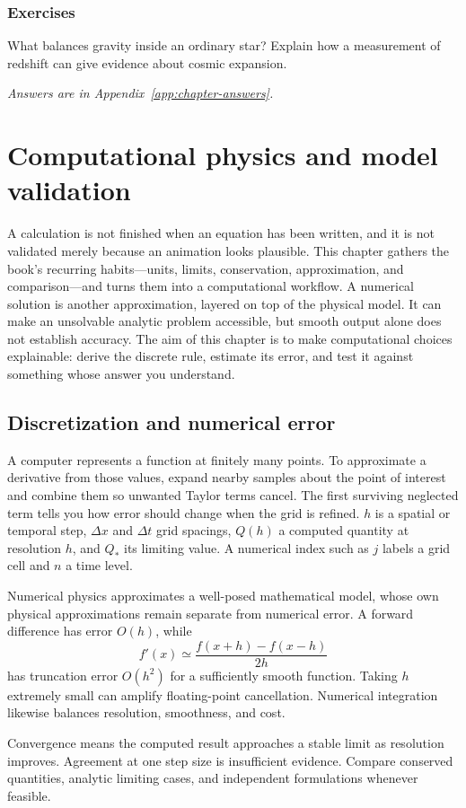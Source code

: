 \documentclass[11pt,oneside]{book}
\theoremstyle{reviewstyle}
\newcommand{\learningcheck}[1]{\subsection*{Exercises}\noindent #1\par\smallskip\noindent\emph{Answers are in Appendix~\ref{app:chapter-answers}.}}
\begin{document}
\learningcheck{What balances gravity inside an ordinary star? Explain how a measurement of redshift can give evidence about cosmic expansion.}

\chapter{Computational physics and model validation}
A calculation is not finished when an equation has been written, and it is not validated merely because an animation looks plausible. This chapter gathers the book's recurring habits---units, limits, conservation, approximation, and comparison---and turns them into a computational workflow.
A numerical solution is another approximation, layered on top of the physical model. It can make an unsolvable analytic problem accessible, but smooth output alone does not establish accuracy. The aim of this chapter is to make computational choices explainable: derive the discrete rule, estimate its error, and test it against something whose answer you understand.

\section{Discretization and numerical error}
A computer represents a function at finitely many points. To approximate a derivative from those values, expand nearby samples about the point of interest and combine them so unwanted Taylor terms cancel. The first surviving neglected term tells you how error should change when the grid is refined. $h$ is a spatial or temporal step, $\Delta x$ and $\Delta t$ grid spacings, $Q(h)$ a computed quantity at resolution $h$, and $Q_*$ its limiting value. A numerical index such as $j$ labels a grid cell and $n$ a time level.

Numerical physics approximates a well-posed mathematical model, whose own physical approximations remain separate from numerical error. A forward difference has error $O(h)$, while
\begin{equation}f'(x)\simeq\frac{f(x+h)-f(x-h)}{2h}\end{equation}
has truncation error $O(h^2)$ for a sufficiently smooth function. Taking $h$ extremely small can amplify floating-point cancellation. Numerical integration likewise balances resolution, smoothness, and cost.

Convergence means the computed result approaches a stable limit as resolution improves. Agreement at one step size is insufficient evidence. Compare conserved quantities, analytic limiting cases, and independent formulations whenever feasible.
\end{document}

